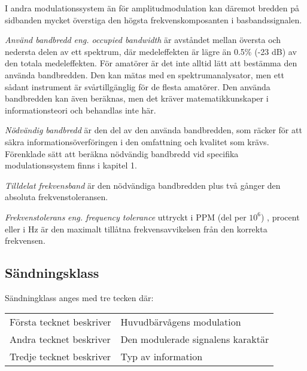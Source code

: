 I andra modulationssystem än för amplitudmodulation kan däremot bredden på
sidbanden mycket överstiga den högsta frekvenskomposanten i basbandssignalen.

\emph{Använd bandbredd} \emph{eng. occupied bandwidth} är avståndet mellan
översta och nedersta delen av ett spektrum, där medeleffekten är lägre än 0.5\%
(-23 dB) av den totala medeleffekten. För amatörer är det inte alltid lätt att
bestämma den använda bandbredden. Den kan mätas med en spektrumanalysator, men
ett sådant instrument är svårtillgänglig för de flesta amatörer. Den använda
bandbredden kan även beräknas, men det kräver matematikkunskaper i
informationsteori och behandlas inte här.

\emph{Nödvändig bandbredd} är den del av den använda bandbredden, som räcker
för att säkra informationsöverföringen i den omfattning och kvalitet som krävs.
Förenklade sätt att beräkna nödvändig bandbredd vid specifika modulationssystem
finns i kapitel 1.

\emph{Tilldelat frekvensband} är den nödvändiga bandbredden plus två gånger den
absoluta frekvenstoleransen.

\emph{Frekvenstolerans} \emph{eng. frequency tolerance} uttryckt i PPM (del per
\(10^6\)) , procent eller i Hz är den maximalt tillåtna frekvensavvikelsen från
den korrekta frekvensen.

\subsection{Sändningsklass}
Sändningklass anges med tre tecken där:\\
\begin{tabular}{ll}
	Första tecknet beskriver &  Huvudbärvågens modulation \\
	Andra tecknet beskriver & Den modulerade signalens karaktär \\
	Tredje tecknet beskriver & Typ av information \\
\end{tabular}

